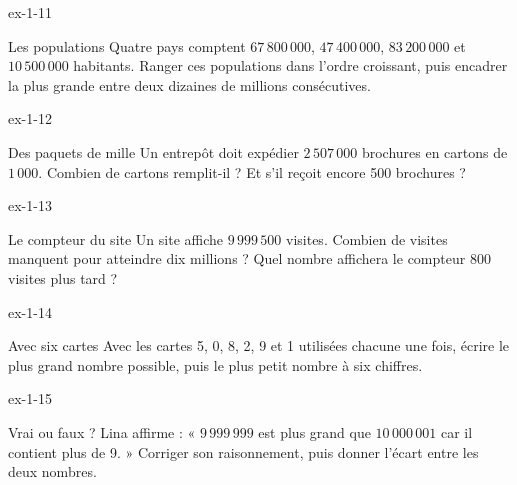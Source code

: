 \begin{blocLivre}{ex-1-11}\begin{exercice}[3]{Les populations}
Quatre pays comptent $67\,800\,000$, $47\,400\,000$, $83\,200\,000$ et $10\,500\,000$ habitants. Ranger ces populations dans l’ordre croissant, puis encadrer la plus grande entre deux dizaines de millions consécutives.
\end{exercice}\end{blocLivre}
\begin{blocLivre}{ex-1-12}\begin{exercice}[3]{Des paquets de mille}
Un entrepôt doit expédier $2\,507\,000$ brochures en cartons de $1\,000$. Combien de cartons remplit-il ? Et s’il reçoit encore 500 brochures ?
\end{exercice}\end{blocLivre}
\begin{blocLivre}{ex-1-13}\begin{exercice}[3]{Le compteur du site}
Un site affiche $9\,999\,500$ visites. Combien de visites manquent pour atteindre dix millions ? Quel nombre affichera le compteur 800 visites plus tard ?
\end{exercice}\end{blocLivre}
\begin{blocLivre}{ex-1-14}\begin{exercice}[3]{Avec six cartes}
Avec les cartes 5, 0, 8, 2, 9 et 1 utilisées chacune une fois, écrire le plus grand nombre possible, puis le plus petit nombre à six chiffres.
\end{exercice}\end{blocLivre}
\begin{blocLivre}{ex-1-15}\begin{exercice}[3]{Vrai ou faux ?}
Lina affirme : « $9\,999\,999$ est plus grand que $10\,000\,001$ car il contient plus de 9. » Corriger son raisonnement, puis donner l’écart entre les deux nombres.
\end{exercice}\end{blocLivre}

\clearpage
